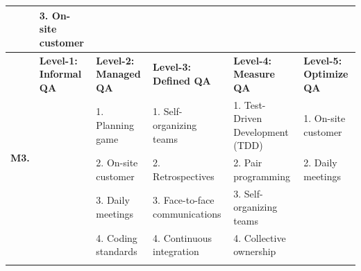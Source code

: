 \documentclass[a4paper,oneside]{bth}
\begin{document}
\begin{longtable}{|p{1.3cm}|p{2cm}|p{2cm}|p{2.7cm}|p{2cm} |p{2cm} |}
				& 3. On-site customer                                  &                                                             &                                                                                                     &                                                        &                                                                                              \\ \hline
				\multirow{9}{*}{\textbf{M3.}}  & \textbf{Level-1: Informal QA}                        & \textbf{Level-2: Managed QA}                                & \textbf{Level-3: Defined QA}                                                                        & \textbf{Level-4: Measure QA}                           & \textbf{Level-5: Optimize QA}                                                                \\ \cline{2-6} 
				& \multirow{8}{*}{}                                    & 1. Planning game                                            & 1. Self-organizing teams                                                                            & 1. Test-Driven Development (TDD)                       & 1. On-site customer                                                                          \\ \cline{3-6} 
				&                                                      & 2. On-site customer                                         & 2. Retrospectives                                                                                   & 2. Pair programming                                    & 2. Daily meetings                                                                           \\ \cline{3-6}  
				&                                                      & 3. Daily meetings                                           & 3. Face-to-face communications                                                                      & 3. Self-organizing teams                               & \multirow{6}{*}{}                                                                            \\ \cline{3-5}
				&                                                      & 4. Coding standards                                         & 4. Continuous integration                                                                           & 4. Collective ownership                                &                                                                                              \\ \cline{3-5}

\end{longtable}
\end{document}

